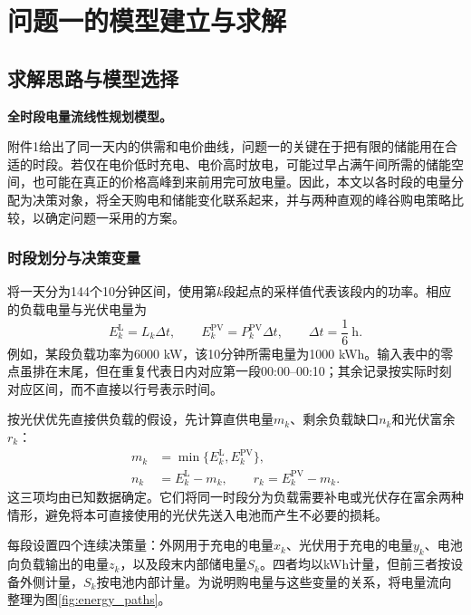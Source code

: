 \section{问题一的模型建立与求解}
\subsection{求解思路与模型选择}

\textbf{全时段电量流线性规划模型。}

附件1给出了同一天内的供需和电价曲线，问题一的关键在于把有限的储能用在合适的时段。若仅在电价低时充电、电价高时放电，可能过早占满午间所需的储能空间，也可能在真正的价格高峰到来前用完可放电量。因此，本文以各时段的电量分配为决策对象，将全天购电和储能变化联系起来，并与两种直观的峰谷购电策略比较，以确定问题一采用的方案。

\subsubsection{时段划分与决策变量}
将一天分为144个10分钟区间，使用第$k$段起点的采样值代表该段内的功率。相应的负载电量与光伏电量为
\begin{equation}
 E^{\mathrm L}_k=L_k\Delta t,\qquad E^{\mathrm{PV}}_k=P^{\mathrm{PV}}_k\Delta t,
 \qquad \Delta t=\frac{1}{6}\ \mathrm h.
 \label{eq:energy_conversion}
\end{equation}
例如，某段负载功率为6000 kW，该10分钟所需电量为1000 kWh。输入表中的零点虽排在末尾，但在重复代表日内对应第一段00:00--00:10；其余记录按实际时刻对应区间，而不直接以行号表示时间。

按光伏优先直接供负载的假设，先计算直供电量$m_k$、剩余负载缺口$n_k$和光伏富余$r_k$：
\begin{equation}
 \begin{aligned}
 m_k&=\min\{E^{\mathrm L}_k,E^{\mathrm{PV}}_k\},\\
 n_k&=E^{\mathrm L}_k-m_k,\qquad r_k=E^{\mathrm{PV}}_k-m_k.
 \end{aligned}
 \label{eq:pv_first}
\end{equation}
这三项均由已知数据确定。它们将同一时段分为负载需要补电或光伏存在富余两种情形，避免将本可直接使用的光伏先送入电池而产生不必要的损耗。

每段设置四个连续决策量：外网用于充电的电量$x_k$、光伏用于充电的电量$y_k$、电池向负载输出的电量$z_k$，以及段末内部储电量$S_k$。四者均以kWh计量，但前三者按设备外侧计量，$S_k$按电池内部计量。为说明购电量与这些变量的关系，将电量流向整理为图\ref{fig:energy_paths}。

\begin{inlinefigure}
 
 \caption{问题一的电量分配关系（各箭头表示该时段的电量）}
 \label{fig:energy_paths}
\end{inlinefigure}

